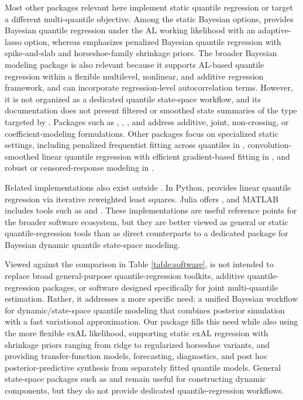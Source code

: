 \documentclass[jss]{jss}
\begin{document}
Most other  packages relevant here implement static quantile regression or target a different multi-quantile objective. Among the static Bayesian options,  \citep{bayesQR} provides Bayesian quantile regression under the AL working likelihood with an adaptive-lasso option, whereas  \citep{pqrBayes} emphasizes penalized Bayesian quantile regression with spike-and-slab and horseshoe-family shrinkage priors. The broader Bayesian modeling package  \citep{brmsfamily} is also relevant because it supports AL-based quantile regression within a flexible multilevel, nonlinear, and additive regression framework, and can incorporate regression-level autocorrelation terms. However, it is not organized as a dedicated quantile state-space workflow, and its documentation does not present filtered or smoothed state summaries of the type targeted by . Packages such as  \citep{qgam},  \citep{qrjoint},  \citep{quantregGrowth}, and  \citep{qrcm} address additive, joint, non-crossing, or coefficient-modeling formulations. Other packages focus on specialized static settings, including penalized frequentist fitting across quantiles in  \citep{rqPen}, convolution-smoothed linear quantile regression with efficient gradient-based fitting in  \citep{conquer}, and robust or censored-response modeling in  \citep{lqr}.

Related implementations also exist outside . In Python,  \citep{statsmodelsQuantReg} provides linear quantile regression via iterative reweighted least squares. Julia offers  \citep{QuantRegjl}, and MATLAB includes tools such as  and  \citep{matlabQuantile}. These implementations are useful reference points for the broader software ecosystem, but they are better viewed as general or static quantile-regression tools than as direct counterparts to a dedicated package for Bayesian dynamic quantile state-space modeling.

Viewed against the comparison in Table \ref{table:software},  is not intended to replace broad general-purpose quantile-regression toolkits, additive quantile-regression packages, or software designed specifically for joint multi-quantile estimation. Rather, it addresses a more specific need: a unified Bayesian workflow for dynamic/state-space quantile modeling that combines posterior simulation with a fast variational approximation. Our package  fills this need while also using the more flexible exAL likelihood, supporting static exAL regression with shrinkage priors ranging from ridge to regularized horseshoe variants, and providing transfer-function models, forecasting, diagnostics, and post hoc posterior-predictive synthesis from separately fitted quantile models. General state-space packages such as  \citep{dlm} and  \citep{dynr} remain useful for constructing dynamic components, but they do not provide dedicated quantile-regression workflows.
\end{document}
